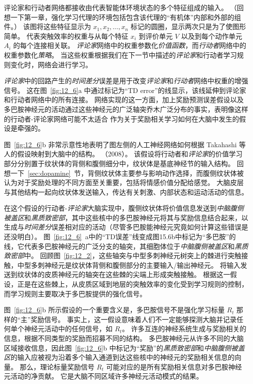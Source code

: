 评论家和行动者网络都接收由代表智能体环境状态的多个特征组成的输入。
（回想一下第一章，强化学习代理的环境包括包含该代理的“有机体”内部和外部的组件。）
该图将这些特征显示为 $x_1,x_2,...,x_n$ 标记的圆圈，显示两次只是为了使图形简单。
代表突触效率的权重与从每个特征 $x_i$ 到评价单元 $V$ 以及到每个动作单元 $A_i$ 的每个连接相关联。
\textit{评论家}网络中的权重参数化\textit{价值函数}，而\textit{行动者}网络中的权重参数化\textit{策略}。
当这些权重根据我们在下一节中描述的\textit{评论家}和行动者学习规则变化时，网络会进行学习。


\textit{评论家}中的回路产生的\textit{时间差分}误差是用于改变\textit{评论家}和\textit{行动者}网络中权重的增强信号。
这在图~\ref{fig:12_6}a 中通过标记为“TD error”的线显示，该线延伸到评论家和行动者网络中的所有连接。
网络实现的这一方面，加上奖励预测误差假设以及多巴胺神经元的活动通过这些神经元的广泛轴突乔木广泛分布的事实，表明像这样的行动者-评论家网络可能不太适合 作为关于奖励相关学习如何在大脑中发生的假设是牵强的。


图~\ref{fig:12_6}b 非常示意性地表明了图左侧的人工神经网络如何根据 Takahashi 等人的假设映射到大脑中的结构。 （2008）。
该假设将行动者和\textit{评论家}的价值学习部分分别置于纹状体的背侧和腹侧细分中，纹状体是基底神经节的输入结构。
回想一下~\ref{sec:dopamine}~节，背侧纹状体主要参与影响动作选择，而腹侧纹状体被认为对于奖励处理的不同方面至关重要，包括将情感价值分配给感觉。
大脑皮层与其他结构一起向纹状体发送输入，传达有关刺激、内部状态和运动活动的信息。


在这个假设的行动者-\textit{评论家}大脑实现中，腹侧纹状体将价值信息发送到\textit{中脑腹侧被盖区}和\textit{黑质致密部}，其中这些核中的多巴胺神经元将其与奖励信息结合起来，以生成与\textit{时间差分}误差相对应的活动（尽管多巴胺能神经元究竟如何计算这些错误是 还没明白）。
图~\ref{fig:12_6}~a中的“TD误差”线变成图15.6b中标记为“多巴胺”的线，它代表多巴胺神经元的广泛分支的轴突，其细胞体位于\textit{中脑腹侧被盖区}和\textit{黑质致密部}中。
回顾图~\ref{fig:12_2}，这些轴突与中型多刺神经元树突上的棘进行突触接触，中型多刺神经元是纹状体背侧和腹侧部分的主要输入/输出神经元。
将输入发送到纹状体的皮质神经元的轴突在这些棘的尖端上形成突触接触。
根据这一假设，正是在这些棘上，从皮质区域到地层的突触效率的变化受到学习规则的控制，而学习规则主要取决于多巴胺提供的强化信号。


图~\ref{fig:12_6}b 所示假设的一个重要含义是，多巴胺信号不是强化学习标量 $R_t$ 那样的“主”奖励信号。
事实上，这一假设意味着人们不一定能够探测大脑并记录任何单个神经元活动中的任何信号，如 $R_t$。
许多互连的神经系统生成与奖励相关的信息，根据不同类型的奖励而招募不同的结构。
多巴胺神经元从许多不同的大脑区域接收信息，因此图~\ref{fig:12_6}b 中标记为“奖励”的\textit{黑质致密部}和\textit{中脑腹侧被盖区}的输入应被视为沿着多个输入通道到达这些核中的神经元的奖励相关信息的向量。
那么，理论标量奖励信号 $R_t$ 可能对应的是所有奖励相关信息对多巴胺神经元活动的净贡献。
它是大脑不同区域许多神经元活动模式的结果。


